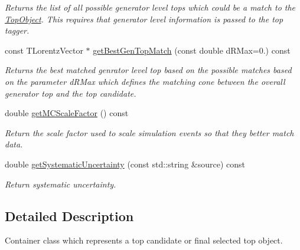 \begin{DoxyCompactItemize}
\begin{DoxyCompactList}\small\item\em Returns the list of all possible generator level tops which could be a match to the \hyperlink{classTopObject}{Top\-Object}. This requires that generator level information is passed to the top tagger. \end{DoxyCompactList}\item 
\hypertarget{classTopObject_a80c459ce3d60d1402087ceead3999e45}{const T\-Lorentz\-Vector $\ast$ \hyperlink{classTopObject_a80c459ce3d60d1402087ceead3999e45}{get\-Best\-Gen\-Top\-Match} (const double d\-R\-Max=0.) const }\label{classTopObject_a80c459ce3d60d1402087ceead3999e45}

\begin{DoxyCompactList}\small\item\em Returns the best matched genrator level top based on the possible matches based on the parameter d\-R\-Max which defines the matching cone between the overall generator top and the top candidate. \end{DoxyCompactList}\item 
\hypertarget{classTopObject_a77edcc1258a253b60747eb557c12dd52}{double \hyperlink{classTopObject_a77edcc1258a253b60747eb557c12dd52}{get\-M\-C\-Scale\-Factor} () const }\label{classTopObject_a77edcc1258a253b60747eb557c12dd52}

\begin{DoxyCompactList}\small\item\em Return the scale factor used to scale simulation events so that they better match data. \end{DoxyCompactList}\item 
\hypertarget{classTopObject_add523f130ec310825913f90f2ad92cd1}{double \hyperlink{classTopObject_add523f130ec310825913f90f2ad92cd1}{get\-Systematic\-Uncertainty} (const std\-::string \&source) const }\label{classTopObject_add523f130ec310825913f90f2ad92cd1}

\begin{DoxyCompactList}\small\item\em Return systematic uncertainty. \end{DoxyCompactList}\end{DoxyCompactItemize}


\subsection{Detailed Description}
Container class which represents a top candidate or final selected top object. 

